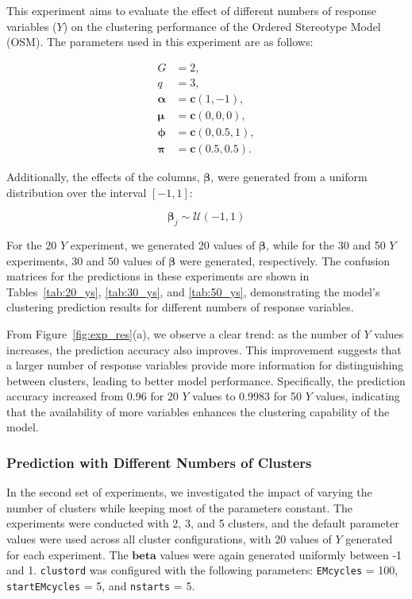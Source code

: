 \documentclass{article}
\begin{document}
This experiment aims to evaluate the effect of different numbers of response variables (\( Y \)) on the clustering performance of the Ordered Stereotype Model (OSM). The parameters used in this experiment are as follows:

\[
\begin{aligned}
G &= 2, \\
q &= 3, \\
\bm{\alpha} &= \mathbf{c}(1, -1), \\
\bm{\mu} &= \mathbf{c}(0, 0, 0), \\
\bm{\phi} &= \mathbf{c}(0, 0.5, 1), \\
\bm{\pi} &= \mathbf{c}(0.5, 0.5).
\end{aligned}
\]

Additionally, the effects of the columns, \(\bm{\beta}\), were generated from a uniform distribution over the interval \([-1, 1]\):

\[
  \bm{\beta}_j \sim \mathcal{U}(-1, 1)
\]

For the 20 \( Y \) experiment, we generated 20 values of \(\bm{\beta}\), while for the 30 and 50 \( Y \) experiments, 30 and 50 values of \(\bm{\beta}\) were generated, respectively. 
The confusion matrices for the predictions in these experiments are shown in Tables~\ref{tab:20_ys}, \ref{tab:30_ys}, and \ref{tab:50_ys}, demonstrating the model's clustering prediction results for different numbers of response variables.

From Figure~\ref{fig:exp_res}(a), we observe a clear trend: as the number of \( Y \) values increases, the prediction accuracy also improves. 
This improvement suggests that a larger number of response variables provide more information for distinguishing between clusters, leading to better model performance. 
Specifically, the prediction accuracy increased from 0.96 for 20 \( Y \) values to 0.9983 for 50 \( Y \) values, indicating that the availability of more variables enhances the clustering capability of the model.

\subsubsection*{Prediction with Different Numbers of Clusters}

In the second set of experiments, we investigated the impact of varying the number of clusters while keeping most of the parameters constant. 
The experiments were conducted with 2, 3, and 5 clusters, and the default parameter values were used across all cluster configurations, with 20 values of \( Y \) generated for each experiment. The \(\bm{beta}\) values were again generated uniformly between -1 and 1. 
\texttt{clustord} was configured with the following parameters: \texttt{EMcycles} = 100, \texttt{startEMcycles} = 5, and \texttt{nstarts} = 5.
\end{document}
